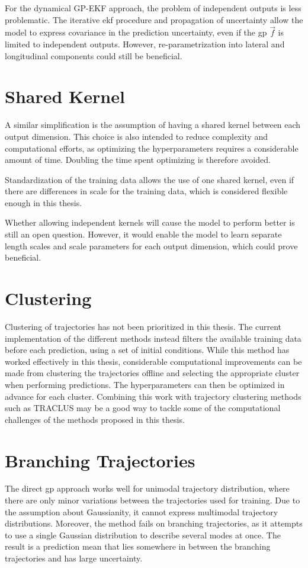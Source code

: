 For the dynamical GP-EKF approach, the problem of independent outputs is less problematic. The iterative \acrshort{ekf} procedure and propagation of uncertainty allow the model to express covariance in the prediction uncertainty, even if the \acrshort{gp} $\vec{f}$ is limited to independent outputs. However, re-parametrization into lateral and longitudinal components could still be beneficial.

\section{Shared Kernel}
A similar simplification is the assumption of having a shared kernel between each output dimension. This choice is also intended to reduce complexity and computational efforts, as optimizing the hyperparameters requires a considerable amount of time. Doubling the time spent optimizing is therefore avoided. 

Standardization of the training data allows the use of one shared kernel, even if there are differences in scale for the training data, which is considered flexible enough in this thesis.

Whether allowing independent kernels will cause the model to perform better is still an open question. However, it would enable the model to learn separate length scales and scale parameters for each output dimension, which could prove beneficial. 



\section{Clustering}
Clustering of trajectories has not been prioritized in this thesis. The current implementation of the different methods instead filters the available training data before each prediction, using a set of initial conditions. While this method has worked effectively in this thesis, considerable computational improvements can be made from clustering the trajectories offline and selecting the appropriate cluster when performing predictions. The hyperparameters can then be optimized in advance for each cluster. Combining this work with trajectory clustering methods such as TRACLUS \cite{traclus} may be a good way to tackle some of the computational challenges of the methods proposed in this thesis.



\section{Branching Trajectories}
The direct \acrshort{gp} approach works well for unimodal trajectory distribution, where there are only minor variations between the trajectories used for training. Due to the assumption about Gaussianity, it cannot express multimodal trajectory distributions. Moreover, the method fails on branching trajectories, as it attempts to use a single Gaussian distribution to describe several modes at once. The result is a prediction mean that lies somewhere in between the branching trajectories and has large uncertainty. 


